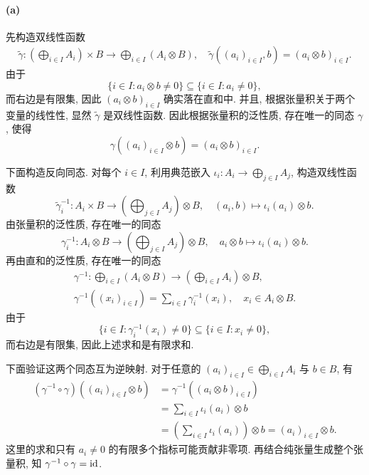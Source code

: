 \documentclass{article}
\begin{document}
\begin{solution}
	\paragraph{(a)} 先构造双线性函数
	\begin{gather*}
		\tilde{\gamma}: \left(\bigoplus_{i \in I} A_i\right) \times B \to \bigoplus_{i \in I}(A_i \otimes B), \quad 
		\tilde{\gamma}((a_i)_{i \in I}, b) = (a_i \otimes b)_{i \in I}.
	\end{gather*}
	由于
	\[ \{i \in I: a_i \otimes b \neq 0\} \subseteq \{i \in I: a_i \neq 0\}, \]
	而右边是有限集, 因此 $(a_i \otimes b)_{i \in I}$ 确实落在直和中. 并且, 根据张量积关于两个变量的线性性, 显然 $\tilde{\gamma}$ 是双线性函数. 因此根据张量积的泛性质, 存在唯一的同态 $\gamma$, 使得
	\[ \gamma((a_i)_{i \in I} \otimes b) = (a_i \otimes b)_{i \in I}. \]

	下面构造反向同态. 对每个 $i \in I$, 利用典范嵌入 $\iota_i: A_i \to \bigoplus_{j \in I} A_j$, 构造双线性函数
	\[
		\tilde{\gamma}_i^{-1}: A_i \times B \to \left(\bigoplus_{j \in I} A_j\right) \otimes B,
		\quad (a_i, b) \mapsto \iota_i(a_i) \otimes b.
	\]
	由张量积的泛性质, 存在唯一的同态
	\[
		\gamma_i^{-1}: A_i \otimes B \to \left(\bigoplus_{j \in I} A_j\right) \otimes B,
		\quad a_i \otimes b \mapsto \iota_i(a_i) \otimes b.
	\]
	再由直和的泛性质, 存在唯一的同态
	\begin{gather*}
		\gamma^{-1}: \bigoplus_{i \in I}(A_i \otimes B) \to \left(\bigoplus_{i \in I} A_i\right) \otimes B, \\
		\gamma^{-1}((x_i)_{i \in I}) = \sum_{i \in I} \gamma_i^{-1}(x_i), \quad x_i \in A_i \otimes B.
	\end{gather*}
	由于
	\[ \{i \in I: \gamma_i^{-1}(x_i) \neq 0\} \subseteq \{i \in I: x_i \neq 0\}, \]
	而右边是有限集, 因此上述求和是有限求和.

	下面验证这两个同态互为逆映射. 对于任意的 $(a_i)_{i \in I} \in \bigoplus_{i \in I} A_i$ 与 $b \in B$, 有
	\begin{align*}
		(\gamma^{-1} \circ \gamma)((a_i)_{i \in I} \otimes b)
		&= \gamma^{-1}((a_i \otimes b)_{i \in I}) \\
		&= \sum_{i \in I} \iota_i(a_i) \otimes b \\
		&= \left(\sum_{i \in I} \iota_i(a_i)\right) \otimes b
		= (a_i)_{i \in I} \otimes b.
	\end{align*}
	这里的求和只有 $a_i \neq 0$ 的有限多个指标可能贡献非零项. 再结合纯张量生成整个张量积, 知 $\gamma^{-1} \circ \gamma = \operatorname{id}$.


\end{solution}
\end{document}
